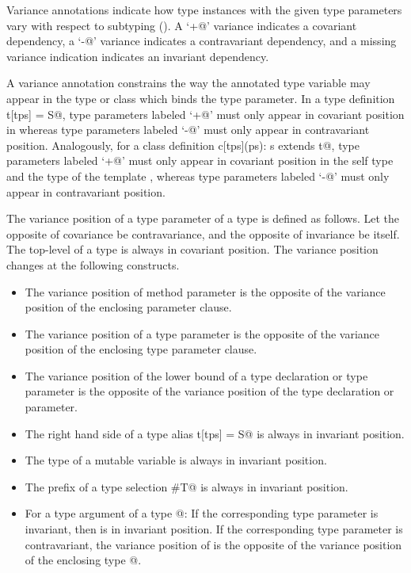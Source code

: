 \documentclass[11pt]{report}
\begin{document}
Variance annotations indicate how type instances with the given type
parameters vary with respect to subtyping ().  A
`\verb@+@' variance indicates a covariant dependency, a `\verb@-@'
variance indicates a contravariant dependency, and a missing variance
indication indicates an invariant dependency.

A variance annotation constrains the way the annotated type variable
may appear in the type or class which binds the type parameter.  In a
type definition \verb@type t[tps] = S@, type parameters labeled
`\verb@+@' must only appear in covariant position in \verb@S@ whereas
type parameters labeled `\verb@-@' must only appear in contravariant
position. Analogously, for a class definition
\verb@class c[tps](ps): s extends t@, type parameters labeled
`\verb@+@' must only appear in covariant position in the self type
\verb@s@ and the type of the template \verb@t@, whereas type
parameters labeled `\verb@-@' must only appear in contravariant
position. 

The variance position of a type parameter of a type is defined as
follows.  Let the opposite of covariance be contravariance, and the
opposite of invariance be itself.  The top-level of a type is always
in covariant position. The variance position changes at the following
constructs.
\begin{itemize}
\item
The variance position of method parameter is the opposite of the 
variance position of the enclosing parameter clause.
\item
The variance position of a type parameter is the opposite of the
variance position of the enclosing type parameter clause.
\item
The variance position of the lower bound of a type declaration or type parameter 
is the opposite of the variance position of the type declaration or parameter.  
\item
The right hand side \verb@S@ of a type alias \verb@type t[tps] = S@ 
is always in invariant position.
\item
The type of a mutable variable is always in invariant position.
\item 
The prefix \verb@S@ of a type selection \verb@S#T@ is always in invariant position.
\item
For a type argument \verb@T@ of a type \verb@S[... T ... ]@: If the
corresponding type parameter is invariant, then \verb@T@ is in
invariant position.  If the corresponding type parameter is
contravariant, the variance position of \verb@T@ is the opposite of
the variance position of the enclosing type \verb@S[... T ... ]@.
\end{itemize}
\end{document}
